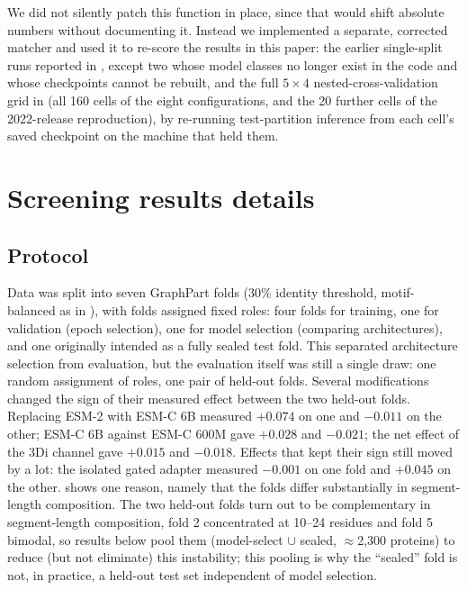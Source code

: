 \documentclass{article}
\begin{document}
We did not silently patch this function in place, since that would shift absolute numbers without documenting it. Instead we implemented a separate, corrected matcher and used it to re-score the results in this paper: the earlier single-split runs reported in , except two whose model classes no longer exist in the code and whose checkpoints cannot be rebuilt, and the full $5\times4$ nested-cross-validation grid in  (all 160 cells of the eight configurations, and the 20 further cells of the 2022-release reproduction), by re-running test-partition inference from each cell's saved checkpoint on the machine that held them. 

\section{Screening results details}
\label{sec:app-old-protocol}

\subsection{Protocol}

Data was split into seven GraphPart folds (30\% identity threshold, motif-balanced as in ), with folds assigned fixed roles: four folds for training, one for validation (epoch selection), one for model selection (comparing architectures), and one originally intended as a fully sealed test fold. This separated architecture selection from evaluation, but the evaluation itself was still a single draw: one random assignment of roles, one pair of held-out folds. Several modifications changed the sign of their measured effect between the two held-out folds. Replacing ESM-2 with ESM-C 6B measured $+0.074$ on one and $-0.011$ on the other; ESM-C 6B against ESM-C 600M gave $+0.028$ and $-0.021$; the net effect of the 3Di channel gave $+0.015$ and $-0.018$. Effects that kept their sign still moved by a lot: the isolated gated adapter measured $-0.001$ on one fold and $+0.045$ on the other.  shows one reason, namely that the folds differ substantially in segment-length composition. The two held-out folds turn out to be complementary in segment-length composition, fold 2 concentrated at 10--24 residues and fold 5 bimodal, so results below pool them (model-select $\cup$ sealed, $\approx$2{,}300 proteins) to reduce (but not eliminate) this instability; this pooling is why the ``sealed'' fold is not, in practice, a held-out test set independent of model selection.
\end{document}

